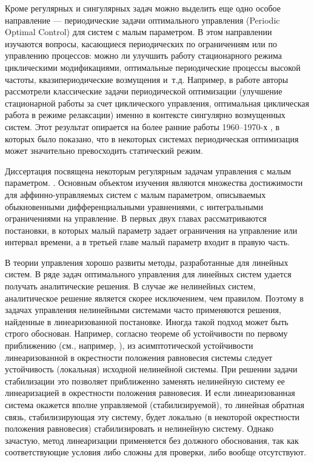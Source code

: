 \documentclass[../main.tex]{subfiles}
\begin{document}
Кроме регулярных и сингулярных задач можно выделить еще одно особое направление --- периодические задачи оптимального управления (Periodic Optimal Control) для систем с малым параметром. 
В этом направлении изучаются вопросы, касающиеся периодических по ограничениям или по управлению процессов: можно ли улучшить работу стационарного режима циклическими модификациями, оптимальные периодические процессы высокой частоты, квазипериодические возмущения и т.д. 
Например, в работе \cite{Guardabassi} авторы рассмотрели классические задачи периодической оптимизации (улучшение стационарной работы за счет циклического управления, оптимальная циклическая работа в режиме релаксации) именно в контексте сингулярно возмущенных систем. 
Этот результат опирается на более ранние работы 1960–1970-х \cite{HornBailey1968,Rinaldi,Locatelli,HornBailey1971}, в которых было показано, что в некоторых системах периодическая оптимизация может значительно превосходить статический режим.

Диссертация посвящена некоторым регулярным задачам управления с малым параметром.  . 
Основным объектом изучения являются  множества достижимости для аффинно-управляемых систем с малым параметром, описываемых обыкновенными дифференциальными уравнениями, с интегральными ограничениями на управление. 
В первых двух главах рассматриваются постановки, в которых малый параметр задает ограничения на управление или интервал времени, а в третьей главе малый параметр входит в правую часть. 

В теории управления хорошо развиты методы, разработанные для линейных систем. 
В ряде задач оптимального управления для линейных систем удается получать аналитические решения. 
В случае же нелинейных систем, аналитическое решение является скорее исключением, чем правилом. 
Поэтому в задачах управления нелинейными системами часто применяются решения, найденные в линеаризованной постановке. 
Иногда такой подход может быть строго обоснован. 
Например, согласно теореме об устойчивости по первому приближению (см., например, \cite{Barbashin_book}), из асимптотической устойчивости линеаризованной в окрестности положения равновесия системы следует устойчивость (локальная) исходной нелинейной системы. 
При решении задачи стабилизации это позволяет приближенно заменять нелинейную систему ее линеаризацией в окрестности положения равновесия. 
И если линеаризованная система окажется вполне управляемой (стабилизируемой), то линейная обратная связь, стабилизирующая эту систему, будет локально (в некоторой окрестности положения равновесия) стабилизировать и нелинейную систему\cite{Kras_add, Stab_lectures, Khalil, Polyak_book}.  
Однако зачастую, метод линеаризации применяется без должного обоснования, так как соответствующие условия либо сложны для проверки, либо вообще отсутствуют.
\end{document}
